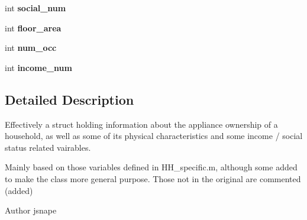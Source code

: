 \begin{DoxyCompactItemize}
\item 
\hypertarget{classuk_1_1ac_1_1dmu_1_1iesd_1_1cascade_1_1util_1_1profilegenerators_1_1_m_s_household_characteristics_aa56aef64f34e2e74be5b9864a8bca81a}{int {\bfseries social\-\_\-num}}\label{classuk_1_1ac_1_1dmu_1_1iesd_1_1cascade_1_1util_1_1profilegenerators_1_1_m_s_household_characteristics_aa56aef64f34e2e74be5b9864a8bca81a}

\item 
\hypertarget{classuk_1_1ac_1_1dmu_1_1iesd_1_1cascade_1_1util_1_1profilegenerators_1_1_m_s_household_characteristics_a871f47ba320599d2d143dd421c6b59cd}{int {\bfseries floor\-\_\-area}}\label{classuk_1_1ac_1_1dmu_1_1iesd_1_1cascade_1_1util_1_1profilegenerators_1_1_m_s_household_characteristics_a871f47ba320599d2d143dd421c6b59cd}

\item 
\hypertarget{classuk_1_1ac_1_1dmu_1_1iesd_1_1cascade_1_1util_1_1profilegenerators_1_1_m_s_household_characteristics_a7e8b14d7b4a3df2f30d2745783de4a76}{int {\bfseries num\-\_\-occ}}\label{classuk_1_1ac_1_1dmu_1_1iesd_1_1cascade_1_1util_1_1profilegenerators_1_1_m_s_household_characteristics_a7e8b14d7b4a3df2f30d2745783de4a76}

\item 
\hypertarget{classuk_1_1ac_1_1dmu_1_1iesd_1_1cascade_1_1util_1_1profilegenerators_1_1_m_s_household_characteristics_a30517d9d3a1b7fa63a9ce1d5d811dddf}{int {\bfseries income\-\_\-num}}\label{classuk_1_1ac_1_1dmu_1_1iesd_1_1cascade_1_1util_1_1profilegenerators_1_1_m_s_household_characteristics_a30517d9d3a1b7fa63a9ce1d5d811dddf}

\end{DoxyCompactItemize}


\subsection{Detailed Description}
Effectively a struct holding information about the appliance ownership of a household, as well as some of its physical characteristics and some income / social status related vairables. 

Mainly based on those variables defined in H\-H\-\_\-specific.\-m, although some added to make the class more general purpose. Those not in the original are commented (added)

\begin{DoxyAuthor}{Author}
jsnape 
\end{DoxyAuthor}


